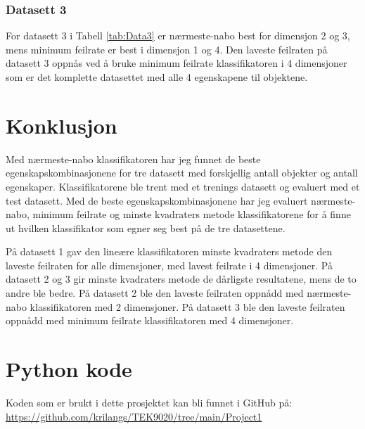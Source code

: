 \documentclass[twocolumn,norwegian]{article}
\begin{document}
\subsubsection{Datasett 3}
For datasett 3 i Tabell \ref{tab:Data3} er nærmeste-nabo best for dimensjon 2 og 3, mens minimum feilrate er best i dimensjon 1 og 4. Den laveste feilraten på datasett 3 oppnås ved å bruke minimum feilrate klassifikatoren i 4 dimensjoner som er det komplette datasettet med alle 4 egenskapene til objektene.

\section{Konklusjon}
Med nærmeste-nabo klassifikatoren har jeg funnet de beste egenskapskombinasjonene for tre datasett med forskjellig antall objekter og antall egenskaper. Klassifikatorene ble trent med et trenings datasett og evaluert med et test datasett. Med de beste egenskapskombinasjonene har jeg evaluert nærmeste-nabo, minimum feilrate og minste kvadraters metode klassifikatorene for å finne ut hvilken klassifikator som egner seg best på de tre datasettene.

På datasett 1 gav den lineære klassifikatoren minste kvadraters metode den laveste feilraten for alle dimensjoner, med lavest feilrate i 4 dimensjoner. På datasett 2 og 3 gir minste kvadraters metode de dårligste resultatene, mens de to andre ble bedre. På datasett 2 ble den laveste feilraten oppnådd med nærmeste-nabo klassifikatoren med 2 dimensjoner. På datasett 3 ble den laveste feilraten oppnådd med minimum feilrate klassifikatoren med 4 dimensjoner.

\appendix
\section{Python kode}
Koden som er brukt i dette prosjektet kan bli funnet i GitHub på: \url{https://github.com/krilangs/TEK9020/tree/main/Project1}
\end{document}
